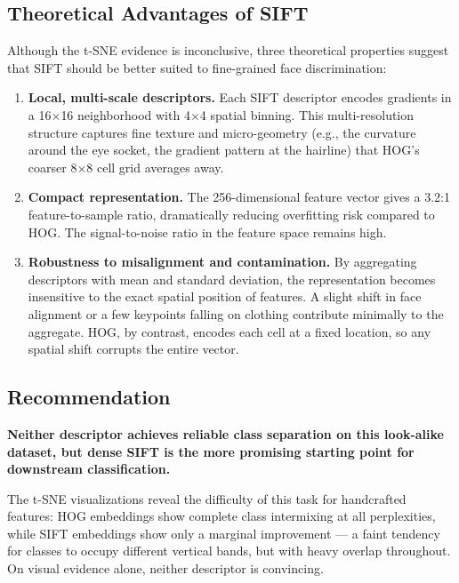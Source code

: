 \documentclass[a4paper,10pt]{article}
\begin{document}
\subsection{Theoretical Advantages of SIFT}

Although the t-SNE evidence is inconclusive, three theoretical properties suggest that SIFT should be better suited to fine-grained face discrimination:

\begin{enumerate}
    \item \textbf{Local, multi-scale descriptors.} Each SIFT descriptor encodes gradients in a 16$\times$16 neighborhood with 4$\times$4 spatial binning.
    This multi-resolution structure captures fine texture and micro-geometry (e.g., the curvature around the eye socket, the gradient pattern at the hairline) that HOG's coarser 8$\times$8 cell grid averages away.

    \item \textbf{Compact representation.} The 256-dimensional feature vector gives a 3.2:1 feature-to-sample ratio, dramatically reducing overfitting risk compared to HOG.
    The signal-to-noise ratio in the feature space remains high.

    \item \textbf{Robustness to misalignment and contamination.} By aggregating descriptors with mean and standard deviation, the representation becomes insensitive to the exact spatial position of features.
    A slight shift in face alignment or a few keypoints falling on clothing contribute minimally to the aggregate.
    HOG, by contrast, encodes each cell at a fixed location, so any spatial shift corrupts the entire vector.
\end{enumerate}

\subsection{Recommendation}

\textbf{Neither descriptor achieves reliable class separation on this look-alike dataset, but dense SIFT is the more promising starting point for downstream classification.}

The t-SNE visualizations reveal the difficulty of this task for handcrafted features: HOG embeddings show complete class intermixing at all perplexities, while SIFT embeddings show only a marginal improvement --- a faint tendency for classes to occupy different vertical bands, but with heavy overlap throughout.
On visual evidence alone, neither descriptor is convincing.
\end{document}
